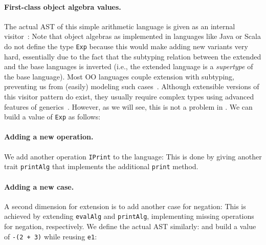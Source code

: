 \paragraph{First-class object algebra values.}

The actual AST of this simple arithmetic language is given as an internal
visitor~\citep{Oliveira_2008}:
Note that object algebras as implemented in languages like Java or Scala do not
define the type \lstinline{Exp} because this would make adding new variants very
hard, essentially due to the fact that the subtyping relation between the
extended and the base languages is inverted (i.e., the extended language is a
\emph{supertype} of the base language). Most OO languages couple extension with
subtyping, preventing us from (easily) modeling such
cases~\citep{oliveira09modular}. Although extensible versions of this visitor
pattern do exist, they usually require complex types using advanced features of
generics~\citep{oliveira2012extensibility, togersen:2004}. However, as we will
see, this is not a problem in \sedel. We can build a value of \lstinline{Exp} as
follows:


\paragraph{Adding a new operation.}

We add another operation \lstinline{IPrint} to the language:
This is done by giving another trait \lstinline{printAlg} that implements the
additional \lstinline{print} method.


\paragraph{Adding a new case.}

A second dimension for extension is to add another case for negation:
This is achieved by extending \lstinline{evalAlg} and \lstinline{printAlg}, implementing
missing operations for negation, respectively. We define the actual AST similarly:
and build a value of \lstinline{-(2 + 3)} while reusing \lstinline{e1}:

